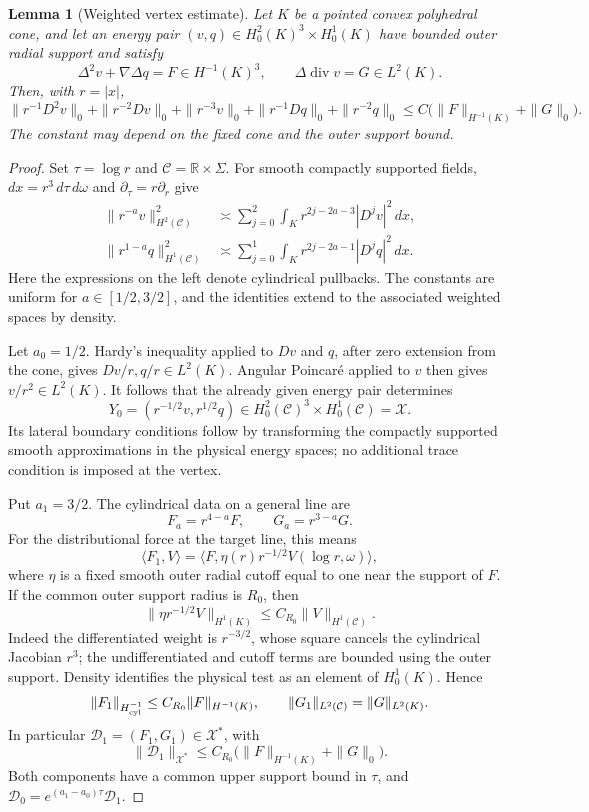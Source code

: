 \documentclass[11pt,a4paper]{article}
\newtheorem{lemma}[theorem]{Lemma}
\theoremstyle{remark}
\numberwithin{equation}{section}
\begin{document}
\begin{lemma}[Weighted vertex estimate]\label{lem:g-vertexweights}
Let $K$ be a pointed convex polyhedral cone, and let an energy pair
$(v,q)\in H^2_0(K)^3\times H^1_0(K)$ have bounded outer radial support and
satisfy
\[
 \Delta^2v+\nabla\Delta q=F\in H^{-1}(K)^3,\qquad
 \Delta\operatorname{div}v=G\in L^2(K).
\]
Then, with $r=|x|$,
\[
 \|r^{-1}D^2v\|_0+\|r^{-2}Dv\|_0+\|r^{-3}v\|_0
 +\|r^{-1}Dq\|_0+\|r^{-2}q\|_0
 \le C\bigl(\|F\|_{H^{-1}(K)}+\|G\|_0\bigr).
\]
The constant may depend on the fixed cone and the outer support bound.
\end{lemma}
\begin{proof}
Set $\tau=\log r$ and $\mathcal C=\mathbb R\times\Sigma$.
For smooth compactly supported fields, $dx=r^3\,d\tau\,d\omega$ and
$\partial_\tau=r\partial_r$ give
\begin{align}
 \|r^{-a}v\|_{H^2(\mathcal C)}^2
 &\asymp\sum_{j=0}^{2}\int_K
       r^{2j-2a-3}|D^jv|^2\,dx,
 \label{eq:g-cylindrical-velocity}\\
 \|r^{1-a}q\|_{H^1(\mathcal C)}^2
 &\asymp\sum_{j=0}^{1}\int_K
       r^{2j-2a-1}|D^jq|^2\,dx .
 \label{eq:g-cylindrical-pressure}
\end{align}
Here the expressions on the left denote cylindrical pullbacks.
The constants are uniform for $a\in[1/2,3/2]$, and the identities extend
to the associated weighted spaces by density.

Let $a_0=1/2$. Hardy's inequality applied to $Dv$ and $q$, after
zero extension from the cone, gives $Dv/r,q/r\in L^2(K)$.
Angular Poincar\'e applied to $v$ then gives $v/r^2\in L^2(K)$.
It follows that the already given energy pair determines
\[
 Y_0=(r^{-1/2}v,r^{1/2}q)\in
 H^2_0(\mathcal C)^3\times H^1_0(\mathcal C)=\mathcal X.
\]
Its lateral boundary conditions follow by transforming the compactly
supported smooth approximations in the physical energy spaces; no
additional trace condition is imposed at the vertex.

Put $a_1=3/2$. The cylindrical data on a general line are
\begin{equation}\label{eq:g-mellin-data-conversion}
 F_a=r^{4-a}F,\qquad G_a=r^{3-a}G.
\end{equation}
For the distributional force at the target line, this means
\[
 \langle F_1,V\rangle
 =\langle F,\eta(r)r^{-1/2}V(\log r,\omega)\rangle ,
\]
where $\eta$ is a fixed smooth outer radial cutoff equal to one near
the support of $F$. If the common outer support radius is $R_0$, then
\[
 \|\eta r^{-1/2}V\|_{H^1(K)}
 \le C_{R_0}\|V\|_{H^1(\mathcal C)}.
\]
Indeed the differentiated weight is $r^{-3/2}$, whose square cancels
the cylindrical Jacobian $r^3$; the undifferentiated and cutoff terms
are bounded using the outer support. Density identifies the physical
test as an element of $H^1_0(K)$. Hence
\[
 \|F_1\|_{H^{-1}_{\rm cyl}}\le C_{R_0}\|F\|_{H^{-1}(K)},
 \qquad
 \|G_1\|_{L^2(\mathcal C)}=\|G\|_{L^2(K)}.
\]
In particular $\mathcal D_1=(F_1,G_1)\in\mathcal X^*$, with
\[
 \|\mathcal D_1\|_{\mathcal X^*}
 \le C_{R_0}\bigl(\|F\|_{H^{-1}(K)}+\|G\|_0\bigr).
\]
Both components have a common upper support bound in $\tau$, and
$\mathcal D_0=e^{(a_1-a_0)\tau}\mathcal D_1$.


\end{proof}
\end{document}
